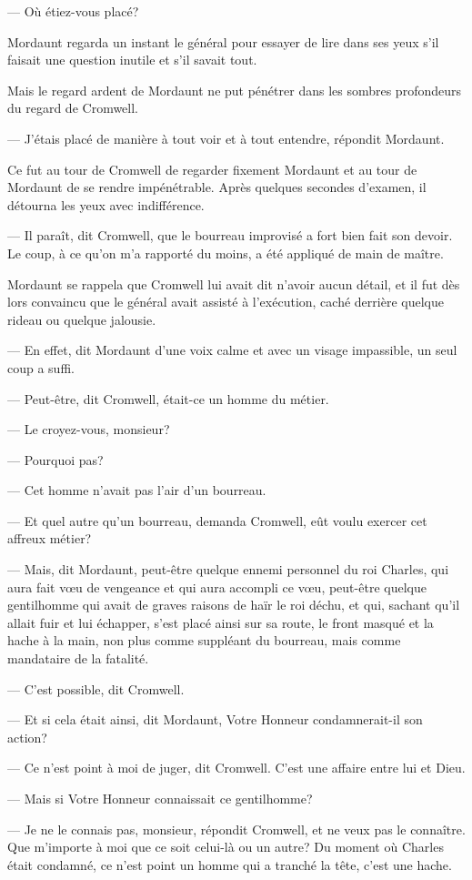 — Où étiez-vous placé?

Mordaunt regarda un instant le général pour essayer de lire dans ses yeux s'il faisait une question inutile et s'il savait tout.

Mais le regard ardent de Mordaunt ne put pénétrer dans les sombres profondeurs du regard de Cromwell.

— J'étais placé de manière à tout voir et à tout entendre, répondit Mordaunt.

Ce fut au tour de Cromwell de regarder fixement Mordaunt et au tour de Mordaunt de se rendre impénétrable. Après quelques secondes d'examen, il détourna les yeux avec indifférence.

— Il paraît, dit Cromwell, que le bourreau improvisé a fort bien fait son devoir. Le coup, à ce qu'on m'a rapporté du moins, a été appliqué de main de maître.

Mordaunt se rappela que Cromwell lui avait dit n'avoir aucun détail, et il fut dès lors convaincu que le général avait assisté à l'exécution, caché derrière quelque rideau ou quelque jalousie.

— En effet, dit Mordaunt d'une voix calme et avec un visage impassible, un seul coup a suffi.

— Peut-être, dit Cromwell, était-ce un homme du métier.

— Le croyez-vous, monsieur?

— Pourquoi pas?

— Cet homme n'avait pas l'air d'un bourreau.

— Et quel autre qu'un bourreau, demanda Cromwell, eût voulu exercer cet affreux métier?

— Mais, dit Mordaunt, peut-être quelque ennemi personnel du roi Charles, qui aura fait vœu de vengeance et qui aura accompli ce vœu, peut-être quelque gentilhomme qui avait de graves raisons de haïr le roi déchu, et qui, sachant qu'il allait fuir et lui échapper, s'est placé ainsi sur sa route, le front masqué et la hache à la main, non plus comme suppléant du bourreau, mais comme mandataire de la fatalité.

— C'est possible, dit Cromwell.

— Et si cela était ainsi, dit Mordaunt, Votre Honneur condamnerait-il son action?

— Ce n'est point à moi de juger, dit Cromwell. C'est une affaire entre lui et Dieu.

— Mais si Votre Honneur connaissait ce gentilhomme?

— Je ne le connais pas, monsieur, répondit Cromwell, et ne veux pas le connaître. Que m'importe à moi que ce soit celui-là ou un autre? Du moment où Charles était condamné, ce n'est point un homme qui a tranché la tête, c'est une hache.


